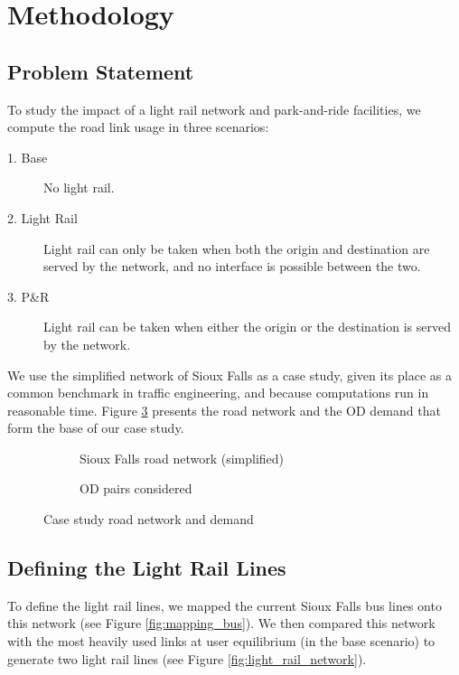 \section{Methodology}

\subsection{Problem Statement}

To study the impact of a light rail network and park-and-ride facilities, we compute the road link usage in three scenarios:
\begin{description}
    \item[1. Base] No light rail.
    \item[2. Light Rail] Light rail can only be taken when both the origin and destination are served by the network, and no interface is possible between the two.
    \item[3. P\&R] Light rail can be taken when either the origin or the destination is served by the network.
\end{description}

We use the simplified network of Sioux Falls as a case study, given its place as a common benchmark in traffic engineering, and because computations run in reasonable time. Figure \ref{fig:casestudy} presents the road network and the OD demand that form the base of our case study.

\begin{figure}
    \centering
    \begin{subfigure}{0.5\textwidth}
    \centering
    \resizebox{\textwidth}{!}{}
    \caption{Sioux Falls road network (simplified)}
    \label{fig:sf_network}
    \end{subfigure}%
    \begin{subfigure}{0.5\textwidth}
    \centering
    \resizebox{\textwidth}{!}{}
    \caption{OD pairs considered}
    \label{fig:od_paires}
    \end{subfigure}
    \caption{Case study road network and demand}
    \label{fig:casestudy}
\end{figure}

\subsection{Defining the Light Rail Lines}

To define the light rail lines, we mapped the current Sioux Falls bus lines onto this network (see Figure \ref{fig:mapping_bus}). We then compared this network with the most heavily used links at user equilibrium (in the base scenario) to generate two light rail lines (see Figure \ref{fig:light_rail_network}).

